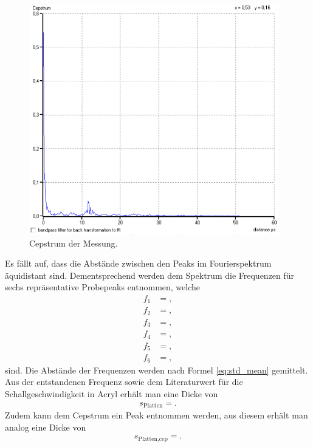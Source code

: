 \begin{figure}
  \centering
  \includegraphics[height=10cm]{messdaten/cepstrum.png}
  \caption{Cepstrum der Messung.}
  \label{fig:cep}
\end{figure}

Es fällt auf, dass die Abstände zwischen den Peaks im Fourierspektrum äquidistant sind.
Dementsprechend werden dem Spektrum die Frequenzen für sechs repräsentative Probepeaks entnommen, welche
\begin{align*}
  f_{1} &= , \\
  f_{2} &= , \\
  f_{3} &= , \\
  f_{4} &= , \\
  f_{5} &= , \\
  f_{6} &= ,
\end{align*}
sind.
Die Abstände der Frequenzen werden nach Formel \eqref{eq:std_mean} gemittelt.
Aus der entstandenen Frequenz sowie dem Literaturwert für die Schallgeschwindigkeit in Acryl erhält man eine Dicke von
\begin{align*}
  s_\text{Platten} = .
\end{align*}
Zudem kann dem Cepstrum ein Peak entnommen werden, aus diesem erhält man analog eine Dicke von
\begin{align*}
  s_\text{Platten,cep} = .
\end{align*}

